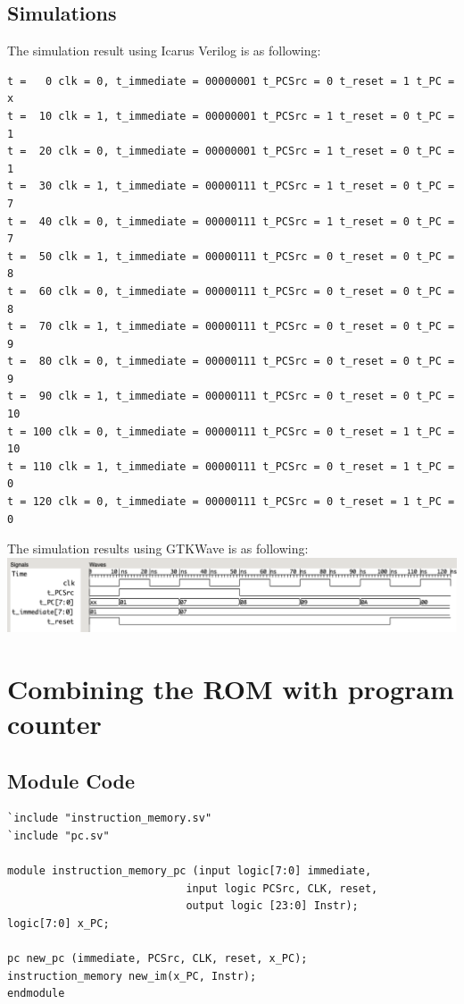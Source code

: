 \documentclass{article}
\begin{document}
\subsection{Simulations}
The simulation result using Icarus Verilog is as following:
\begin{Verbatim}
t =   0 clk = 0, t_immediate = 00000001 t_PCSrc = 0 t_reset = 1 t_PC =   x
t =  10 clk = 1, t_immediate = 00000001 t_PCSrc = 1 t_reset = 0 t_PC =   1
t =  20 clk = 0, t_immediate = 00000001 t_PCSrc = 1 t_reset = 0 t_PC =   1
t =  30 clk = 1, t_immediate = 00000111 t_PCSrc = 1 t_reset = 0 t_PC =   7
t =  40 clk = 0, t_immediate = 00000111 t_PCSrc = 1 t_reset = 0 t_PC =   7
t =  50 clk = 1, t_immediate = 00000111 t_PCSrc = 0 t_reset = 0 t_PC =   8
t =  60 clk = 0, t_immediate = 00000111 t_PCSrc = 0 t_reset = 0 t_PC =   8
t =  70 clk = 1, t_immediate = 00000111 t_PCSrc = 0 t_reset = 0 t_PC =   9
t =  80 clk = 0, t_immediate = 00000111 t_PCSrc = 0 t_reset = 0 t_PC =   9
t =  90 clk = 1, t_immediate = 00000111 t_PCSrc = 0 t_reset = 0 t_PC =  10
t = 100 clk = 0, t_immediate = 00000111 t_PCSrc = 0 t_reset = 1 t_PC =  10
t = 110 clk = 1, t_immediate = 00000111 t_PCSrc = 0 t_reset = 1 t_PC =   0
t = 120 clk = 0, t_immediate = 00000111 t_PCSrc = 0 t_reset = 1 t_PC =   0
\end{Verbatim}
The simulation results using GTKWave is as following:\vspace{5pt}\\
\includegraphics[width=\textwidth]{pc.png}

\newpage
\section{Combining the ROM with program counter}
\subsection{Module Code}
\begin{lstlisting}
`include "instruction_memory.sv"
`include "pc.sv"

module instruction_memory_pc (input logic[7:0] immediate,
                            input logic PCSrc, CLK, reset,
                            output logic [23:0] Instr);
logic[7:0] x_PC;             

pc new_pc (immediate, PCSrc, CLK, reset, x_PC);
instruction_memory new_im(x_PC, Instr);
endmodule
\end{lstlisting}
\end{document}
